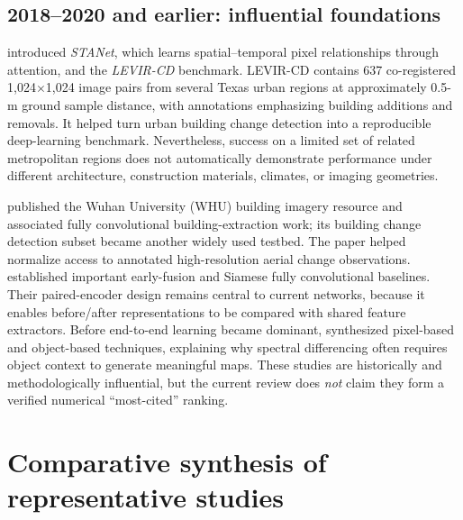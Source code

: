 \documentclass[11pt,a4paper]{article}
\begin{document}
\subsection{2018--2020 and earlier: influential foundations}

\citet{ChenShi2020} introduced \emph{STANet}, which learns spatial--temporal pixel relationships through attention, and the \emph{LEVIR-CD} benchmark. LEVIR-CD contains 637 co-registered 1,024$\times$1,024 image pairs from several Texas urban regions at approximately 0.5-m ground sample distance, with annotations emphasizing building additions and removals. It helped turn urban building change detection into a reproducible deep-learning benchmark. Nevertheless, success on a limited set of related metropolitan regions does not automatically demonstrate performance under different architecture, construction materials, climates, or imaging geometries.

\citet{Ji2019} published the Wuhan University (WHU) building imagery resource and associated fully convolutional building-extraction work; its building change detection subset became another widely used testbed. The paper helped normalize access to annotated high-resolution aerial change observations. \citet{Daudt2018} established important early-fusion and Siamese fully convolutional baselines. Their paired-encoder design remains central to current networks, because it enables before/after representations to be compared with shared feature extractors. Before end-to-end learning became dominant, \citet{Hussain2013} synthesized pixel-based and object-based techniques, explaining why spectral differencing often requires object context to generate meaningful maps. These studies are historically and methodologically influential, but the current review does \emph{not} claim they form a verified numerical ``most-cited'' ranking.

\section{Comparative synthesis of representative studies}
\end{document}

